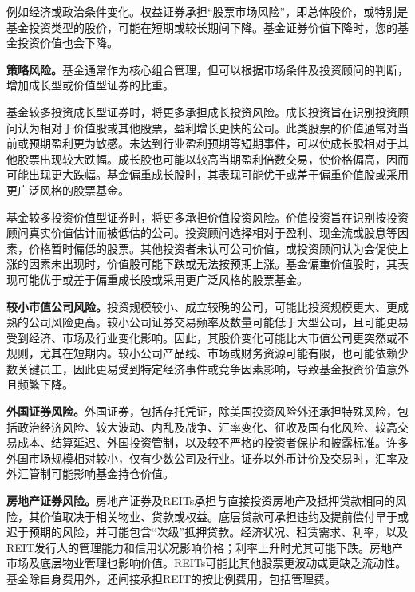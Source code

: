 \documentclass[UTF8,fontset=none,11pt,a4paper]{ctexart}
\begin{document}
例如经济或政治条件变化。权益证券承担“股票市场风险”，即总体股价，或特别是基金投资类型的股价，可能在短期或较长期间下降。基金证券价值下降时，您的基金投资价值\allowbreak\mbox{也会下降。}

\textbf{策略风险。}基金通常作为核心组合管理，但可以根据市场条件及投资顾问的判断，增加成长型或价值型证\allowbreak\mbox{券的比重。}

基金较多投资成长型证券时，将更多承担成长投资风险。成长投资旨在识别投资顾问认为相对于价值股或其他股票，盈利增长更快的公司。此类股票的价值通常对当前或预期盈利更为敏感。未达到行业盈利预期等短期事件，可以使成长股相对于其他股票出现较大跌幅。成长股也可能以较高当期盈利倍数交易，使价格偏高，因而可能出现更大跌幅。基金偏重成长股时，其表现可能优于或差于偏重价值股或采用更广泛风格的\allowbreak\mbox{股票基金。}

基金较多投资价值型证券时，将更多承担价值投资风险。价值投资旨在识别按投资顾问真实价值估计而被低估的公司。投资顾问选择相对于盈利、现金流或股息等因素，价格暂时偏低的股票。其他投资者未认可公司价值，或投资顾问认为会促使上涨的因素未出现时，价值股可能下跌或无法按预期上涨。基金偏重价值股时，其表现可能优于或差于偏重成长股或采用更广泛风格的\allowbreak\mbox{股票基金。}

\textbf{较小市值公司风险。}投资规模较小、成立较晚的公司，可能比投资规模更大、更成熟的公司风险更高。较小公司证券交易频率及数量可能低于大型公司，且可能更易受到经济、市场及行业变化影响。因此，其股价变化可能比大市值公司更突然或不规则，尤其在短期内。较小公司产品线、市场或财务资源可能有限，也可能依赖少数关键员工，因此更易受到特定经济事件或竞争因素影响，导致基金投资价值意外且\allowbreak\mbox{频繁下降。}


\par{}\label{originalpage5}
\textbf{外国证券风险。}外国证券，包括存托凭证，除美国投资风险外还承担特殊风险，包括政治经济风险、较大波动、内乱及战争、汇率变化、征收及国有化风险、较高交易成本、结算延迟、外国投资管制，以及较不严格的投资者保护和披露标准。许多外国市场规模相对较小，仅有少数公司及行业。证券以外币计价及交易时，汇率及外汇管制可能影响基金\allowbreak\mbox{持仓价值。}

\textbf{房地产证券风险。}房地产证券及REITs承担与直接投资房地产及抵押贷款相同的风险，其价值取决于相关物业、贷款或权益。底层贷款可承担违约及提前偿付早于或迟于预期的风险，并可能包含“次级”抵押贷款。经济状况、租赁需求、利率，以及REIT发行人的管理能力和信用状况影响价格；利率上升时尤其可能下跌。房地产市场及底层物业管理也影响价值。REITs可能比其他股票更波动或更缺乏流动性。基金除自身费用外，还间接承担REIT的按比例费用，包\allowbreak\mbox{括管理费。}
\end{document}
